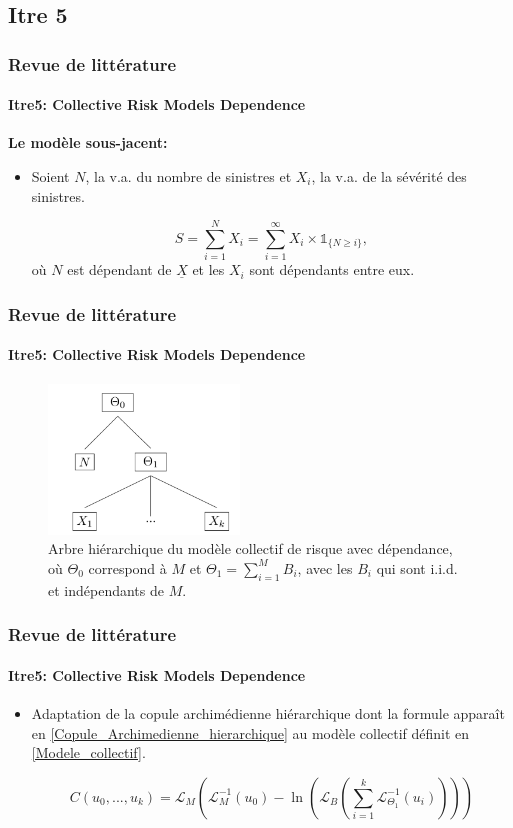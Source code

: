 \documentclass[11pt]{beamer}
\begin{document}
\subsection{Itre 5}
\begin{frame}
	\frametitle{Revue de littérature}
	\framesubtitle{Itre5: Collective Risk Models Dependence \cite{Itre5}}

		\textbf{Le modèle sous-jacent:}
		\begin{itemize}
			\item Soient $N$, la v.a. du nombre de sinistres et $X_i$, la v.a. de la sévérité des sinistres.
			
		\begin{equation}\label{Modele_collectif}
			S = \sum_{i=1}^{N} X_i = \sum_{i=1}^{\infty} X_i \times \mathds{1}_{\{N \geq i\}},
		\end{equation}
		où $N$ est dépendant de $\underline{X}$ et les $X_i$ sont dépendants entre eux.
	
		\end{itemize}
\end{frame}


\begin{frame}
	\frametitle{Revue de littérature}
	\framesubtitle{Itre5: Collective Risk Models Dependence \cite{Itre5}}
	
	\begin{figure}[H]
		\centering
		\includegraphics[height=4cm]{Hierarchie}
		\renewcommand{\figurename}{Illustration}
		\caption{Arbre hiérarchique du modèle collectif de risque avec dépendance, où $\Theta_0$ correspond à $M$ et $\Theta_1 = \sum_{i=1}^{M}B_i$, avec les $B_i$ qui sont i.i.d. et indépendants de $M$.}\label{hierarchie_Modele_collectif}
	\end{figure}
	
\end{frame}


\begin{frame}
	\frametitle{Revue de littérature}
	\framesubtitle{Itre5: Collective Risk Models Dependence \cite{Itre5}}
	
	\begin{itemize}
		\item Adaptation de la copule archimédienne hiérarchique dont la formule apparaît en \eqref{Copule_Archimedienne_hierarchique} au modèle collectif définit en \eqref{Modele_collectif}.

		\begin{equation*}
			C(u_0, ..., u_k) = \mathcal{L}_M \left( 
				\mathcal{L}_{M}^{-1} (u_0) - \ln \left(
					\mathcal{L}_B \left(
						\sum_{i=1}^{k} \mathcal{L}_{\Theta_1}^{-1}(u_i)
							\right)\right)\right)
		\end{equation*}
	\end{itemize}
\end{frame}
\end{document}
